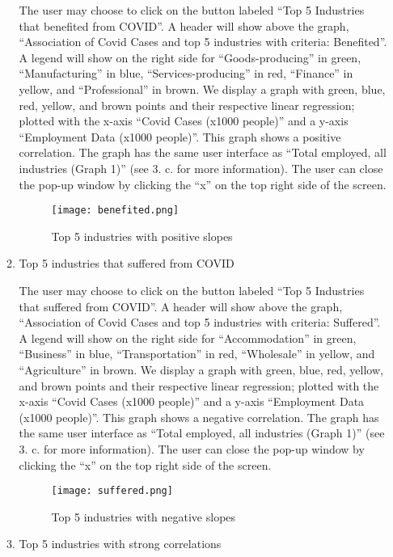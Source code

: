 \documentclass[fontsize=11pt]{article}
\begin{document}
\begin{enumerate}
\begin{enumerate}
The user may choose to click on the button labeled ``Top 5 Industries that benefited from COVID”. A header will show above the graph, ``Association of Covid Cases and top 5 industries with criteria: Benefited”. A legend will show on the right side for ``Goods-producing” in green, ``Manufacturing” in blue, ``Services-producing” in red, ``Finance” in yellow, and ``Professional” in brown. We display a graph with green, blue, red, yellow, and brown points and their respective linear regression; plotted with the x-axis ``Covid Cases (x1000 people)” and a y-axis ``Employment Data (x1000 people)”. This graph shows a positive correlation. The graph has the same user interface as ``Total employed, all industries (Graph 1)” (see 3. c. for more information). The user can close the pop-up window by clicking the ``x” on the top right side of the screen.



\begin{figure}[h!]
  \caption{Top 5 industries with positive slopes}
\centering
\texttt{[image: benefited.png]}
\end{figure}

\raggedright

\item Top 5 industries that suffered from COVID

The user may choose to click on the button labeled ``Top 5 Industries that suffered from COVID”. A header will show above the graph, ``Association of Covid Cases and top 5 industries with criteria: Suffered”. A legend will show on the right side for ``Accommodation” in green, ``Business” in blue, ``Transportation” in red, ``Wholesale” in yellow, and ``Agriculture” in brown. We display a graph with green, blue, red, yellow, and brown points and their respective linear regression; plotted with the x-axis ``Covid Cases (x1000 people)” and a y-axis ``Employment Data (x1000 people)”. This graph shows a negative correlation. The graph has the same user interface as ``Total employed, all industries (Graph 1)” (see 3. c. for more information). The user can close the pop-up window by clicking the ``x” on the top right side of the screen.

\begin{figure}[h!]
  \caption{Top 5 industries with negative slopes}
\centering
\texttt{[image: suffered.png]}
\end{figure}

\raggedright

\item Top 5 industries with strong correlations


\end{enumerate}
\end{enumerate}
\end{document}
